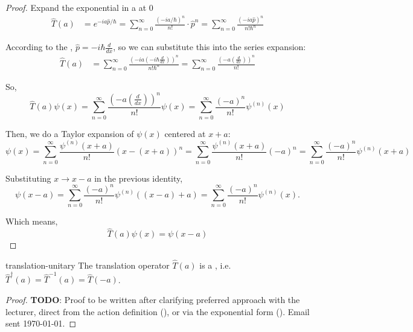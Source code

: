 \documentclass[12pt]{article}
\begin{document}
\begin{proof}
  Expand the exponential in a  at $0$ 
  \begin{align*}
  \hat{T}(a) &= e^{-i a \hat{p}/\hbar} = \sum_{n=0}^{\infty} \frac{(-ia/\hbar)^n}{n!} \cdot \hat{p}^n = \sum_{n=0}^{\infty} \frac{(-i a \hat{p})^n}{n! \hbar^{n}}
  \end{align*} 

  According to the , $\hat{p} = -i\hbar \frac{d}{dx}$, so we can substitute this into the series expansion:
  \begin{align*}
  \hat{T}(a) &= \sum_{n=0}^{\infty} \frac{(-i a (-i\hbar \frac{d}{dx}))^n}{n! \hbar^{n}} = \sum_{n=0}^{\infty} \frac{(- a ( \frac{d}{dx}))^n}{n!} 
  \end{align*}

  So, 
  \[\hat{T}(a) \psi(x) = \sum_{n=0}^{\infty} \frac{(- a ( \frac{d}{dx}))^n}{n!} \psi(x) = \sum_{n=0}^{\infty} \frac{(- a)^n}{n!} \psi^{(n)}(x)\] 
  
  Then, we do a Taylor expansion of $\psi(x)$ centered at $x + a$: 
  \[\psi(x) = \sum_{n=0}^{\infty} \frac{\psi^{(n)}(x + a)}{n!} (x - (x + a))^n = \sum_{n=0}^{\infty} \frac{\psi^{(n)}(x + a)}{n!} (-a)^n = \sum_{n=0}^{\infty} \frac{(-a)^n}{n!} \psi^{(n)}(x + a) \] 

  Substituting $x \to x - a$ in the previous identity,
  \[\psi(x - a) = \sum_{n=0}^{\infty} \frac{(-a)^n}{n!} \psi^{(n)}((x - a) + a) = \sum_{n=0}^{\infty} \frac{(-a)^n}{n!} \psi^{(n)}(x).\]

  Which means, 
  \[\hat{T}(a) \psi(x) = \psi(x - a)\] 
\end{proof}

\begin{thm}{translation-unitary}
  The translation operator $\hat{T}(a)$ is a , i.e. $\hat{T}^{\dagger}(a) = \hat{T}^{-1}(a) = \hat{T}(-a)$.
\end{thm}

\begin{rem}

\end{rem}

\begin{proof}
  {\color{blue}\textbf{TODO}: Proof to be written after clarifying preferred approach with the lecturer, direct from the action definition (), or via the exponential form (). Email sent \today.}
\end{proof}
\end{document}
